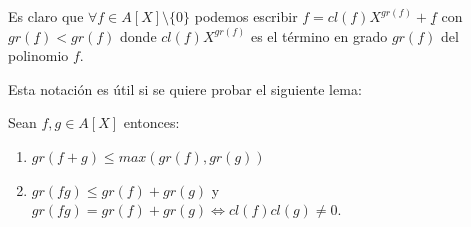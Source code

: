 Es claro que $\forall f \in A[X] \setminus \{0\}$ podemos escribir $f = cl(f)X^{gr(f)}+\underline{f}$ con $gr(\underline{f}) < gr(f)$ donde $cl(f)X^{gr(f)}$ es el término en grado $gr(f)$ del polinomio $f$. 

Esta notación es útil si se quiere probar el siguiente lema:

\begin{lemma}
Sean $f,g \in A[X]$ entonces:

\begin{enumerate}
\item $gr(f+g) \le max(gr(f),gr(g))$
\item $gr(fg) \le gr(f) + gr(g)$ y $gr(fg) = gr(f) + gr(g) \iff cl(f)cl(g) \neq 0$. 
\end{enumerate}
\end{lemma}

